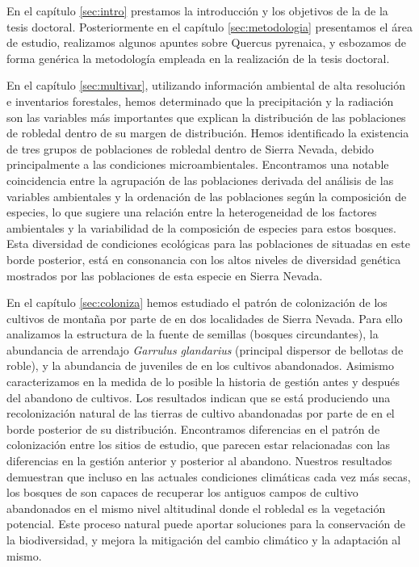 En el \textcolor{ctcolormain}{capítulo \ref{sec:intro}} prestamos la introducción y los objetivos de la de la tesis doctoral. Posteriormente en el \textcolor{ctcolormain}{capítulo \ref{sec:metodologia}} presentamos el área de estudio, realizamos algunos apuntes sobre Quercus pyrenaica, y esbozamos de forma genérica la metodología empleada en la realización de la tesis doctoral. 

En el \textcolor{ctcolormain}{capítulo \ref{sec:multivar}}, utilizando información ambiental de alta resolución e inventarios forestales, hemos determinado que la precipitación y la radiación son las variables más importantes que explican la distribución de las poblaciones de robledal dentro de su margen de distribución. Hemos identificado la existencia de tres grupos de poblaciones de robledal dentro de Sierra Nevada, debido principalmente a las condiciones microambientales. Encontramos una notable coincidencia entre la agrupación de las poblaciones derivada del análisis de las variables ambientales y la ordenación de las poblaciones según la composición de especies, lo que sugiere una relación entre la heterogeneidad de los factores ambientales y la variabilidad de la composición de especies para estos bosques. Esta diversidad de condiciones ecológicas para las poblaciones de \Qp situadas en este borde posterior, está en consonancia con los altos niveles de diversidad genética mostrados por las poblaciones de esta especie en Sierra Nevada. 

En el \textcolor{ctcolormain}{capítulo \ref{sec:coloniza}} hemos estudiado el patrón de colonización de los cultivos de montaña por parte de \Qp en dos localidades de Sierra Nevada. Para ello analizamos la estructura de la fuente de semillas (bosques circundantes), la abundancia de arrendajo \emph{Garrulus glandarius} (principal dispersor de bellotas de roble), y la abundancia de juveniles de \Qp en los cultivos abandonados. Asimismo caracterizamos en la medida de lo posible la historia de gestión antes y después del abandono de cultivos. Los resultados indican que se está produciendo una recolonización natural de las tierras de cultivo abandonadas por parte de \Qp en el borde posterior de su distribución. Encontramos diferencias en el patrón de colonización entre los sitios de estudio, que parecen estar relacionadas con las diferencias en la gestión anterior y posterior al abandono. Nuestros resultados demuestran que incluso en las actuales condiciones climáticas cada vez más secas, los bosques de \Qp son capaces de recuperar los antiguos campos de cultivo abandonados en el mismo nivel altitudinal donde el robledal es la vegetación potencial. Este proceso natural puede aportar soluciones para la conservación de la biodiversidad, y mejora la mitigación del cambio climático y la adaptación al mismo. 

